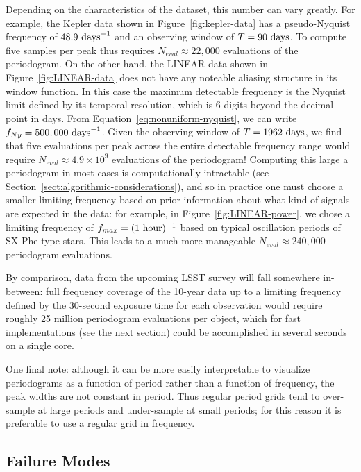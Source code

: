 \documentclass[preprint]{aastex}
\newcommand{\fig}[1]{Figure~\ref{fig:#1}}
\newcommand{\Eq}[1]{Equation~\ref{eq:#1}}
\newcommand{\eq}[1]{\Eq{#1}}
\newcommand{\Sect}[1]{Section~\ref{sect:#1}}
\newcommand{\sect}[1]{\Sect{#1}}
\newcommand{\sectlabel}[1]{\label{sect:#1}}
\begin{document}
Depending on the characteristics of the dataset, this number can vary greatly.
For example, the Kepler data shown in \fig{kepler-data} has a pseudo-Nyquist
frequency of $48.9\ {\rm days}^{-1}$ and
an observing window of $T = 90\ {\rm days}$.
To compute five samples per peak thus requires $N_{eval} \approx 22,000$
evaluations of the periodogram.
On the other hand, the LINEAR data shown in \fig{LINEAR-data} does not have
any noteable aliasing structure in its window function.
In this case the maximum detectable frequency is the Nyquist limit defined
by its temporal resolution, which is 6 digits beyond the decimal point in days.
From \eq{nonuniform-nyquist}, we can write $f_{Ny} = 500,000\ {\rm days}^{-1}$.
Given the observing window of $T = 1962\ {\rm days}$, we find that five
evaluations per peak across the entire detectable frequency range
would require $N_{eval} \approx 4.9 \times 10^9$ evaluations of the periodogram!
Computing this large a periodogram in most cases is computationally intractable
(see \sect{algorithmic-considerations}), and so in practice one must choose
a smaller limiting frequency based on prior information about what kind of
signals are expected in the data: for example, in \fig{LINEAR-power}, we chose
a limiting frequency of $f_{max} = (1\ {\rm hour})^{-1}$ based on typical
oscillation periods of SX Phe-type stars. This leads to a much more manageable
$N_{eval} \approx 240,000$ periodogram evaluations.

By comparison, data from the upcoming LSST survey \citep{Ivezic08LSST}
will fall somewhere in-between: full frequency coverage of
the 10-year data up to a limiting frequency defined by the 30-second
exposure time for each observation would require roughly 25 million
periodogram evaluations per object, which for fast implementations
(see the next section) could be accomplished in several seconds on
a single core.

One final note: although it can be more easily interpretable to
visualize periodograms as a function of period rather than a function of
frequency, the peak widths are not constant in period.
Thus regular period grids tend to over-sample at large periods and under-sample
at small periods;
for this reason it is preferable to use a regular grid in frequency.


\subsection{Failure Modes}
\sectlabel{failure-modes}
\end{document}
